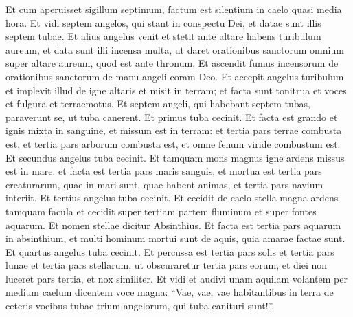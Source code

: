 \begin{biblechapter}  
\verse Et cum aperuisset sigillum septimum, factum est silentium in caelo quasi media hora. 
\verse Et vidi septem angelos, qui stant in conspectu Dei, et datae sunt illis septem tubae. 
\verse Et alius angelus venit et stetit ante altare habens turibulum aureum, et data sunt illi incensa multa, ut daret orationibus sanctorum omnium super altare aureum, quod est ante thronum. 
\verse Et ascendit fumus incensorum de orationibus sanctorum de manu angeli coram Deo. 
\verse Et accepit angelus turibulum et implevit illud de igne altaris et misit in terram; et facta sunt tonitrua et voces et fulgura et terraemotus. 
\verse Et septem angeli, qui habebant septem tubas, paraverunt se, ut tuba canerent. 
\verse Et primus tuba cecinit. Et facta est grando et ignis mixta in sanguine, et missum est in terram: et tertia pars terrae combusta est, et tertia pars arborum combusta est, et omne fenum viride combustum est. 
\verse Et secundus angelus tuba cecinit. Et tamquam mons magnus igne ardens missus est in mare: et facta est tertia pars maris sanguis, 
\verse et mortua est tertia pars creaturarum, quae in mari sunt, quae habent animas, et tertia pars navium interiit. 
\verse Et tertius angelus tuba cecinit. Et cecidit de caelo stella magna ardens tamquam facula et cecidit super tertiam partem fluminum et super fontes aquarum. 
\verse Et nomen stellae dicitur Absinthius. Et facta est tertia pars aquarum in absinthium, et multi hominum mortui sunt de aquis, quia amarae factae sunt. 
\verse Et quartus angelus tuba cecinit. Et percussa est tertia pars solis et tertia pars lunae et tertia pars stellarum, ut obscuraretur tertia pars eorum, et diei non luceret pars tertia, et nox similiter. 
\verse Et vidi et audivi unam aquilam volantem per medium caelum dicentem voce magna: “Vae, vae, vae habitantibus in terra de ceteris vocibus tubae trium angelorum, qui tuba canituri sunt!”. 
\end{biblechapter}


